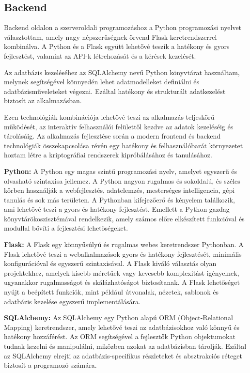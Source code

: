 \newpage
\subsection{Backend}

Backend oldalon a szerveroldali programozáshoz a Python programozási nyelvet választottam, amely nagy népszerűségnek örvend Flask keretrendszerrel kombinálva. A Python és a Flask együtt lehetővé teszik a hatékony és gyors fejlesztést, valamint az API-k létrehozását és a kérések kezelését.

Az adatbázis kezeléséhez az SQLAlchemy nevű Python könyvtárat használtam, melynek segítségével könnyedén lehet adatmodelleket definiálni és adatbázisműveleteket végezni. Ezáltal hatékony és strukturált adatkezelést biztosít az alkalmazásban.

Ezen technológiák kombinációja lehetővé teszi az alkalmazás teljeskörű működését, az interaktív felhasználói felülettől kezdve az adatok kezeléséig és tárolásáig. Az alkalmazás fejlesztése során a modern frontend és backend technológiák összekapcsolása révén egy hatékony és felhasználóbarát környezetet hoztam létre a kriptográfiai rendszerek kipróbálásához és tanulásához.

\vspace{10pt}
\textbf {Python:}
A Python egy magas szintű programozási nyelv, amelyet egyszerű és olvasható szintaxisa jellemez. A Python nagyon rugalmas és sokoldalú, és széles körben használják a webfejlesztés, adatelemzés, mesterséges intelligencia, gépi tanulás és sok más területen. A Pythonban kifejezőerő és kényelem találkozik, ami lehetővé teszi a gyors és hatékony fejlesztést. Emellett a Python gazdag könyvtárökoszisztémával rendelkezik, amely számos előre elkészített funkcióval és modullal bővíti a fejlesztési lehetőségeket.

\vspace{10pt}
\textbf {Flask:}
A Flask egy könnyűsúlyú és rugalmas webes keretrendszer Pythonban. A Flask lehetővé teszi a webalkalmazások gyors és hatékony fejlesztését, minimális konfigurációval és egyszerű szintaxisával. A Flask kiváló választás olyan projektekhez, amelyek kisebb méretűek vagy kevesebb komplexitást igényelnek, ugyanakkor rugalmasságot és skálázhatóságot biztosítanak. A Flask lehetőséget nyújt a beépített funkciók, mint például útvonalak, nézetek, sablonok és adatbázis kezelése egyszerű implementálására.

\vspace{10pt}
\textbf {SQLAlchemy:}
Az SQLAlchemy egy Python alapú ORM (Object-Relational Mapping) keretrendszer, amely lehetővé teszi az adatbázisokhoz való könnyű és hatékony hozzáférést. Az ORM segítségével a fejlesztők Python objektumokat tudnak kezelni és manipulálni, miközben azokat az adatbázisban tárolják. Ezáltal az SQLAlchemy elrejti az adatbázis-specifikus részleteket és absztrakciós réteget biztosít a programozó számára.

